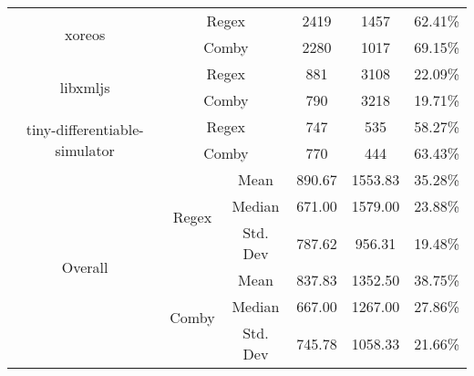 \documentclass[sigconf,review, anonymous]{acmart}
\begin{document}
{\begin{table}[hbtp]
{\begin{tabular}{|c|c|c|c|c|c|}
\multirow{2}{*}{xoreos} & \multicolumn{2}{c|}{Regex} & 2419 & 1457 & 62.41\% \\\cline{2-6}
    & \multicolumn{2}{c|}{Comby} & 2280 & 1017 & 69.15\% \\ \hline
\multirow{2}{*}{libxmljs} & \multicolumn{2}{c|}{Regex} & 881 & 3108 & 22.09\% \\\cline{2-6}
    & \multicolumn{2}{c|}{Comby} & 790 & 3218 & 19.71\% \\ \hline
\multirow{2}{*}{tiny-differentiable-simulator} & \multicolumn{2}{c|}{Regex} & 747 & 535 & 58.27\% \\\cline{2-6}
    & \multicolumn{2}{c|}{Comby} & 770 & 444 & 63.43\% \\ \hline

\multirow{6}{*}{Overall} & \multirow{3}{*}{Regex} & Mean & 890.67 &	1553.83 & 35.28\%\\\cline{3-6}
    &   &  Median & 671.00 & 1579.00 & 23.88\%  \\\cline{3-6}
    &   &  Std. Dev & 787.62 & 956.31 & 19.48\%  \\\cline{2-6}

 & \multirow{3}{*}{Comby} & Mean & 837.83 & 1352.50 & 38.75\% \\\cline{3-6}
    &   &  Median & 667.00 & 1267.00 & 27.86\%  \\\cline{3-6}
    &   &  Std. Dev & 745.78 & 1058.33	& 21.66\%  \\\hline

\end{tabular}
}

\end{table}

\begin{table}[hbtp]
\centering
\caption{Java (Regex vs. Comby)}
\label{tab:table_java1}
\end{table}}
\end{document}

